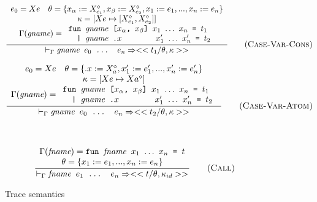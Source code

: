 \documentclass[10pt]{../sigplanconf}
\newcommand{\nfrac}[2]{\frac{\displaystyle{#1}}{\displaystyle{#2}}}
\newcommand{\tagsc}[1]{\tag{\scshape #1}}
\begin{document}
\begin{figure}
  \begin{equation}
    \nfrac{
      \begin{array}{c}
        e_0 = Xe \quad \theta = \{ x_\alpha := X_{e_1}^\diamond, x_\beta := X_{e_2}^\diamond, x_1 := e_1, ..., x_n := e_n \} \\
        \kappa = [Xe \mapsto [X_{e_1}^\diamond, X_{e_2}^\diamond]] \\
        \Gamma(\textit{gname}) =
        \begin{array}{l}
          \texttt{fun \textit{\rmfamily gname} [$x_\alpha$, $x_\beta$] $x_1$ $\ldots$ $x_n$ = $t_1$} \\
          \texttt{\ \ | \textit{\rmfamily gname}\ \texttt{.}$x$ \hspace{1.1cm} $x_1'$ $\ldots$ $x_n'$ = $t_2$} \\
        \end{array}
      \end{array}
    }{
      |-_\Gamma \texttt{\textit{\rmfamily gname} $e_0$ ... $e_n$} => <<t_1 / \theta, \kappa>>
    } \tagsc{Case-Var-Cons}
  \end{equation}

  \begin{equation}
    \nfrac{
      \begin{array}{c}
        e_0 = Xe \quad \theta = \{ .x := X_{a}^\diamond, x_1' := e_1', ..., x_n' := e_n' \} \\
        \kappa = [Xe \mapsto Xa^\diamond] \\
        \Gamma(\textit{gname}) =
        \begin{array}{l}
          \texttt{fun \textit{\rmfamily gname} [$x_\alpha$, $x_\beta$] $x_1$ $\ldots$ $x_n$ = $t_1$} \\
          \texttt{\ \ | \textit{\rmfamily gname}\ \texttt{.}$x$ \hspace{1.1cm} $x_1'$ $\ldots$ $x_n'$ = $t_2$} \\
        \end{array}
      \end{array}
    }{
      |-_\Gamma \texttt{\textit{\rmfamily gname} $e_0$ ... $e_n$} => <<t_2 / \theta, \kappa>>
    } \tagsc{Case-Var-Atom}
  \end{equation}

  ~\newline

  \begin{equation}
    \nfrac{
      \begin{array}{c}
        \Gamma(\textit{fname}) =
          \texttt{fun \textit{\rmfamily fname} $x_1$ $\ldots$ $x_n$ = $t$} \\
        \theta = \{ x_1 := e_1, ..., x_n := e_n \}
      \end{array}
    }{
      |-_\Gamma \texttt{\textit{\rmfamily fname} $e_1$ ... $e_n$} => <<t / \theta, \kappa_{id}>>
    } \tagsc{Call}
  \end{equation}

  \caption{Trace semantics}
  \label{fig:tracing}
\end{figure}
\end{document}

